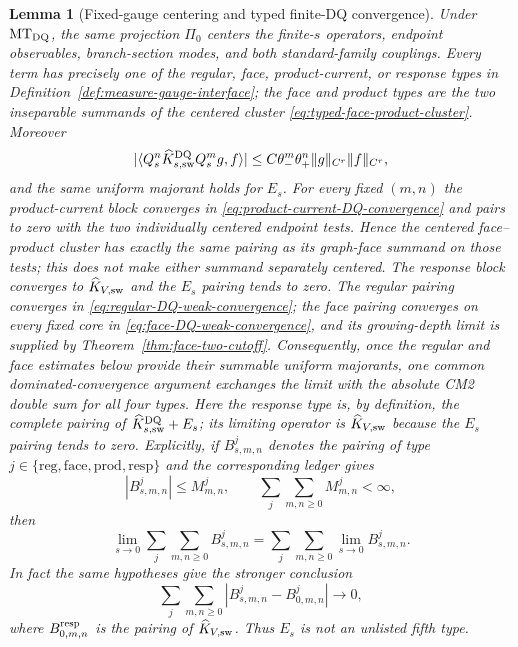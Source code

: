 \documentclass[11pt]{article}
\newtheorem{lemma}[theorem]{Lemma}
\begin{document}
\begin{lemma}[Fixed-gauge centering and typed finite-DQ convergence]
\label{lem:fixed-gauge-centering}
Under $\mathrm{MT}_{\rm DQ}$, the same projection $\Pi_0$ centers the
finite-$s$ operators, endpoint observables, branch-section modes, and both
standard-family couplings.  Every term has precisely one of the regular,
face, product-current, or response types in
Definition~\ref{def:measure-gauge-interface}; the face and product types are
the two inseparable summands of the centered cluster
\eqref{eq:typed-face-product-cluster}.  Moreover
\begin{equation}
\label{eq:derived-strong-weak-CM2}
 |\langle Q_s^n\widehat K_{s,\rm sw}^{\rm DQ}Q_s^mg,f\rangle|
 \le C\theta_-^m\theta_+^n\|g\|_{C^r}\|f\|_{C^r},
\end{equation}
and the same uniform majorant holds for $E_s$.  For every fixed $(m,n)$ the
product-current block converges in
\eqref{eq:product-current-DQ-convergence} and pairs to zero with the two
individually centered endpoint tests.  Hence the centered face--product
cluster has exactly the same pairing as its graph-face summand on those
tests; this does not make either summand separately centered.  The response block converges to
$\widehat K_{V,\rm sw}$ and the $E_s$ pairing
tends to zero.  The regular pairing converges in
\eqref{eq:regular-DQ-weak-convergence}; the face pairing converges on every
fixed core in \eqref{eq:face-DQ-weak-convergence}, and its growing-depth
limit is supplied by Theorem~\ref{thm:face-two-cutoff}.  Consequently, once the
regular and face estimates below provide their summable uniform majorants,
one common dominated-convergence argument exchanges the limit with the
absolute CM2 double sum for all four types.  Here the response type is, by
definition, the complete pairing of
$\widehat K_{s,\rm sw}^{\rm DQ}+E_s$; its limiting operator is
$\widehat K_{V,\rm sw}$ because the $E_s$ pairing tends to zero.  Explicitly,
if $B_{s,m,n}^{j}$ denotes the pairing of type
$j\in\{\mathrm{reg},\mathrm{face},\mathrm{prod},\mathrm{resp}\}$ and the corresponding
ledger gives
\begin{equation}
\label{eq:typed-common-dominated-convergence}
 |B_{s,m,n}^{j}|\le M_{m,n}^{j},\qquad
 \sum_{j}\sum_{m,n\ge0}M_{m,n}^{j}<\infty,
\end{equation}
then
\[
 \lim_{s\to0}\sum_j\sum_{m,n\ge0}B_{s,m,n}^{j}
 =\sum_j\sum_{m,n\ge0}\lim_{s\to0}B_{s,m,n}^{j}.
\]
In fact the same hypotheses give the stronger conclusion
\begin{equation}
\label{eq:typed-l1-DQ-convergence}
 \sum_j\sum_{m,n\ge0}
 \left|B_{s,m,n}^{j}-B_{0,m,n}^{j}\right|\longrightarrow0,
\end{equation}
where $B_{0,m,n}^{\rm resp}$ is the pairing of
$\widehat K_{V,\rm sw}$.  Thus $E_s$ is not an unlisted fifth type.
\end{lemma}
\end{document}
